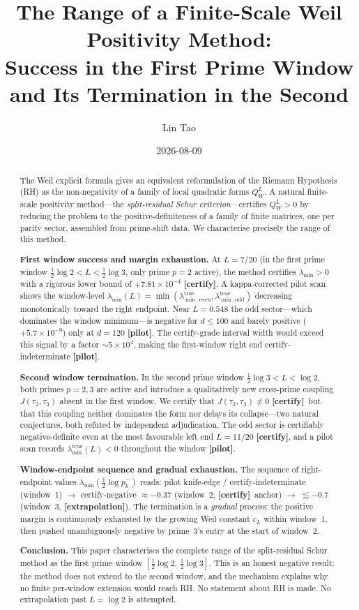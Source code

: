 \documentclass[12pt,a4paper]{amsart}
\title[Range of a Finite-Scale Weil Positivity Method]{The Range of a Finite-Scale Weil Positivity Method:\\
       Success in the First Prime Window and Its Termination in the Second}
\author{Lin Tao}
\date{2026-08-09}
\theoremstyle{plain}
\theoremstyle{definition}
\newcommand{\QW}{Q_W^L}
\newcommand{\lmin}{\lambda_{\min}}
\newcommand{\ltrue}{\lambda_{\min}^{\mathrm{true}}}
\newcommand{\ltrues}[1]{\lambda_{\min,\mathrm{#1}}^{\mathrm{true}}}
\newcommand{\cL}{c_L}
\newcommand{\Jcross}{J(\tau_2,\tau_3)}
\newcommand{\certify}{\textbf{[certify]}}
\newcommand{\pilot}{\textbf{[pilot]}}
\newcommand{\extrap}{\textbf{[extrapolation]}}
\begin{document}
\begin{abstract}
The Weil explicit formula gives an equivalent reformulation of the Riemann
Hypothesis (RH) as the non-negativity of a family of local quadratic forms
$\QW$.  A natural finite-scale positivity method---the
\emph{split-residual Schur criterion}---certifies $\QW > 0$ by reducing the
problem to the positive-definiteness of a family of finite matrices, one per
parity sector, assembled from prime-shift data.  We characterise precisely the
range of this method.

\textbf{First window success and margin exhaustion.}  At $L = 7/20$ (in the
first prime window $\tfrac12\log 2 < L < \tfrac12\log 3$, only prime $p=2$
active), the method certifies $\lmin > 0$ with a rigorous lower bound of
$+7.81\times10^{-4}$ \certify.  A kappa-corrected pilot scan shows the
window-level $\lambda_{\min}(L) = \min(\ltrues{even},
\ltrues{odd})$ decreasing monotonically toward the right endpoint.
Near $L=0.548$ the odd sector---which dominates the window minimum---is
negative for $d \le 100$ and barely positive ($+5.7\times10^{-9}$) only at
$d=120$ \pilot.  The certify-grade interval width would exceed this signal by a
factor $\sim 5\times10^4$, making the first-window right end
certify-indeterminate \pilot.

\textbf{Second window termination.}  In the second prime window
$\tfrac12\log 3 < L < \log 2$, both primes $p=2,3$ are active and introduce a
qualitatively new cross-prime coupling $\Jcross$ absent in the first window.
We certify that $\Jcross \neq 0$ \certify\ but that this coupling neither
dominates the form nor delays its collapse---two natural conjectures, both
refuted by independent adjudication.  The odd sector is certifiably
negative-definite even at the most favourable left end $L=11/20$ \certify, and
a pilot scan records $\ltrue(L) < 0$ throughout the window
\pilot.

\textbf{Window-endpoint sequence and gradual exhaustion.}  The sequence of
right-endpoint values $\lambda_{\min}\!\left(\tfrac12\log p_k^-\right)$ reads:
pilot knife-edge / certify-indeterminate (window~1) $\to$ certify-negative
$\approx -0.37$ (window~2, \certify~anchor) $\to$ $\lesssim -0.7$
(window~3, \extrap).  The termination is a \emph{gradual} process: the
positive margin is continuously exhausted by the growing Weil constant $\cL$
within window~1, then pushed unambiguously negative by prime~3's entry at the
start of window~2.

\textbf{Conclusion.}  This paper characterises the complete range of the
split-residual Schur method as the first prime window
$[\tfrac12\log 2,\, \tfrac12\log 3]$.  This is an honest negative result: the
method does not extend to the second window, and the mechanism explains why no
finite per-window extension would reach RH.  No statement about RH is made.
No extrapolation past $L = \log 2$ is attempted.
\end{abstract}
\end{document}
